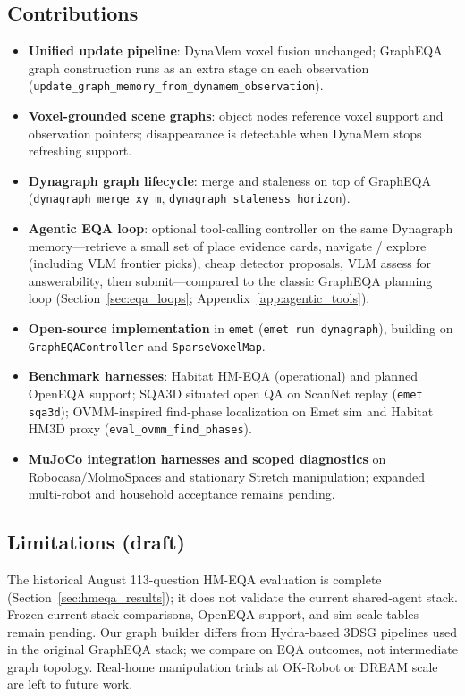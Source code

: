 \subsection{Contributions}

\begin{itemize}
  \item \textbf{Unified update pipeline}: DynaMem voxel fusion unchanged; GraphEQA graph construction runs as an extra stage on each observation (\texttt{update\_graph\_memory\_from\_dynamem\_observation}).
  \item \textbf{Voxel-grounded scene graphs}: object nodes reference voxel support and observation pointers; disappearance is detectable when DynaMem stops refreshing support.
  \item \textbf{Dynagraph graph lifecycle}: merge and staleness on top of GraphEQA (\texttt{dynagraph\_merge\_xy\_m}, \texttt{dynagraph\_staleness\_horizon}).
  \item \textbf{Agentic EQA loop}: optional tool-calling controller on the same Dynagraph memory---retrieve a small set of place evidence cards, navigate / explore (including VLM frontier picks), cheap detector proposals, VLM assess for answerability, then submit---compared to the classic GraphEQA planning loop (Section~\ref{sec:eqa_loops}; Appendix~\ref{app:agentic_tools}).
  \item \textbf{Open-source implementation} in \texttt{emet} (\texttt{emet run dynagraph}), building on \texttt{GraphEQAController} and \texttt{SparseVoxelMap}.
  \item \textbf{Benchmark harnesses}: Habitat HM-EQA (operational) and planned OpenEQA support; SQA3D situated open QA on ScanNet replay (\texttt{emet sqa3d}); OVMM-inspired find-phase localization on Emet sim and Habitat HM3D proxy (\texttt{eval\_ovmm\_find\_phases}).
  \item \textbf{MuJoCo integration harnesses and scoped diagnostics} on Robocasa/MolmoSpaces and stationary Stretch manipulation; expanded multi-robot and household acceptance remains pending.
\end{itemize}

\subsection{Limitations (draft)}

The historical August 113-question HM-EQA evaluation is complete (Section~\ref{sec:hmeqa_results}); it does not validate the current shared-agent stack. Frozen current-stack comparisons, OpenEQA support, and sim-scale tables remain pending.
Our graph builder differs from Hydra-based 3DSG pipelines used in the original GraphEQA stack; we compare on EQA outcomes, not intermediate graph topology.
Real-home manipulation trials at OK-Robot or DREAM scale are left to future work.
